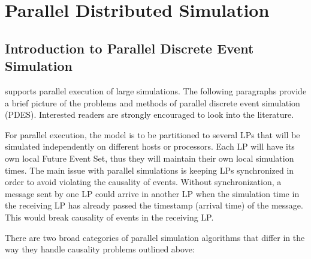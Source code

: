 \chapter{Parallel Distributed Simulation}
\label{cha:parallel-execution}

\section{Introduction to Parallel Discrete Event Simulation}

{\opp} supports parallel execution of large
simulations. The following paragraphs provide a brief picture
of the problems and methods of parallel
discrete event simulation (PDES). Interested readers are
strongly encouraged to look into the literature.

For parallel execution, the model is to be partitioned to several
LPs that will be simulated independently on different hosts or
processors. Each LP will have its own local Future Event Set,
thus they will maintain their own local simulation times. The main issue with
parallel simulations is keeping LPs synchronized in order to
avoid violating the causality of events. Without synchronization, a
message sent by one LP could arrive in another LP when the
simulation time in the receiving LP has already passed the
timestamp (arrival time) of the message. This would break
causality of events in the receiving LP.

There are two broad categories of parallel simulation algorithms
that differ in the way they handle causality problems outlined
above:

